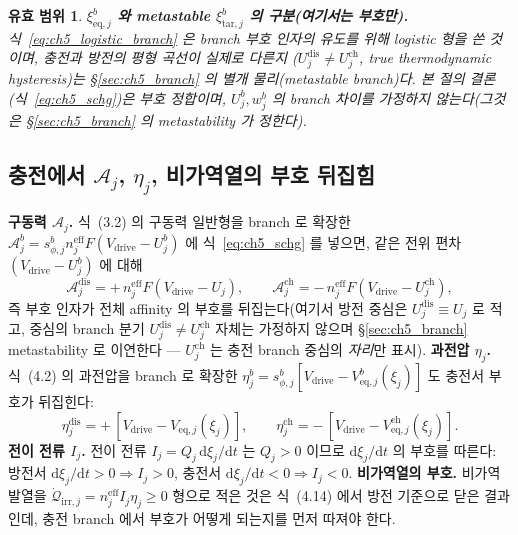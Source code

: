 \documentclass[11pt,a4paper]{article}
\newtheorem*{boundbox}{유효 범위}
\newcommand{\dd}{\mathrm{d}}
\newcommand{\eff}{\mathrm{eff}}
\newcommand{\eq}{\mathrm{eq}}
\newcommand{\drive}{\mathrm{drive}}
\newcommand{\irr}{\mathrm{irr}}
\newcommand{\dis}{\mathrm{dis}}
\newcommand{\chg}{\mathrm{ch}}
\newcommand{\tar}{\mathrm{tar}}
\begin{document}
\begin{boundbox}
\textbf{$\xi_{\eq,j}^b$ 와 metastable $\xi_{\tar,j}^b$ 의 구분(여기서는 부호만).} 식~\eqref{eq:ch5_logistic_branch}
은 branch 부호 인자의 유도를 위해 logistic 형을 쓴 것이며, 충전과 방전의 평형 곡선이 \emph{실제로 다른지}
($U_j^\dis\ne U_j^\chg$, true thermodynamic hysteresis)는 \S\ref{sec:ch5_branch} 의 별개 물리(metastable
branch)다. 본 절의 결론(식~\eqref{eq:ch5_schg})은 부호 정합이며, $U_j^b,w_j^b$ 의 branch 차이를 가정하지
않는다(그것은 \S\ref{sec:ch5_branch} 의 metastability 가 정한다).
\end{boundbox}

\subsection{충전에서 $\mathcal A_j$, $\eta_j$, 비가역열의 부호 뒤집힘}\label{sec:ch5_sign_flip}
\textbf{구동력 $\mathcal A_j$.} 식~(3.2) 의 구동력 일반형을 branch 로 확장한 $\mathcal A_j^b=s_{\phi,j}^b n_j^{\eff}F(V_\drive-U_j^b)$ 에
식~\eqref{eq:ch5_schg} 를 넣으면, 같은 전위 편차 $(V_\drive-U_j^b)$ 에 대해
\begin{equation}
\mathcal A_j^\dis=+\,n_j^{\eff}F(V_\drive-U_j),\qquad
\mathcal A_j^\chg=-\,n_j^{\eff}F(V_\drive-U_j^\chg),
\label{eq:ch5_A_branch}
\end{equation}
즉 부호 인자가 전체 affinity 의 부호를 뒤집는다(여기서 방전 중심은 $U_j^\dis\equiv U_j$ 로 적고, 중심의 branch
분기 $U_j^\dis\ne U_j^\chg$ 자체는 가정하지 않으며 \S\ref{sec:ch5_branch} metastability 로 이연한다 — $U_j^\chg$ 는
충전 branch 중심의 \emph{자리}만 표시). \textbf{과전압 $\eta_j$.} 식~(4.2) 의 과전압을 branch 로 확장한 $\eta_j^b=s_{\phi,j}^b
[V_\drive-V_{\eq,j}^b(\xi_j)]$ 도 충전서 부호가 뒤집힌다:
\begin{equation}
\eta_j^\dis=+\,[V_\drive-V_{\eq,j}(\xi_j)],\qquad
\eta_j^\chg=-\,[V_\drive-V_{\eq,j}^\chg(\xi_j)].
\label{eq:ch5_eta_branch}
\end{equation}
\textbf{전이 전류 $I_j$.} 전이 전류 $I_j=Q_j\,\dd\xi_j/\dd t$ 는 $Q_j>0$ 이므로 $\dd\xi_j/\dd t$ 의 부호를 따른다:
방전서 $\dd\xi_j/\dd t>0\Rightarrow I_j>0$, 충전서 $\dd\xi_j/\dd t<0\Rightarrow I_j<0$. \textbf{비가역열의 부호.}
비가역 발열을 $\dot{\mathcal Q}_{\irr,j}=n_j^{\eff}I_j\eta_j\ge0$ 형으로 적은 것은 식~(4.14) 에서 방전 기준으로
닫은 결과인데, 충전 branch 에서 부호가 어떻게 되는지를 먼저 따져야 한다.
\end{document}
